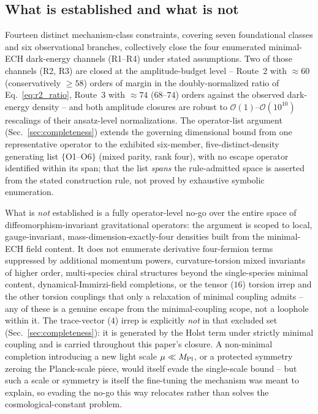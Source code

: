 \documentclass[aps,prd,twocolumn,superscriptaddress,preprintnumbers,nofootinbib,longbibliography,floatfix]{revtex4-2}
\newcommand{\MPl}{M_{\rm Pl}}
\begin{document}
\subsection{What is established and what is not}
Fourteen distinct mechanism-class constraints, covering seven
foundational classes and six observational branches, collectively close
the four enumerated minimal-ECH dark-energy channels (R1--R4) under
stated assumptions. Two of those channels (R2, R3) are closed at the
amplitude-budget level -- Route~2 with ${\approx}60$ (conservatively
$\geq58$) orders of margin in the doubly-normalized ratio of
Eq.~\eqref{eq:r2_ratio}, Route~3 with $\approx74$ ($68$--$74$) orders
against the observed dark-energy density -- and both amplitude closures
are robust to
$\mathcal O(1)$--$\mathcal O(10^{10})$ rescalings of their ansatz-level
normalizations. The operator-list argument (Sec.~\ref{sec:completeness})
extends the governing dimensional bound from one representative operator
to the exhibited six-member, five-distinct-density generating list
$\{$O1--O6$\}$ (mixed parity, rank four), with no escape operator
identified within its span; that the list \emph{spans} the
rule-admitted space is asserted from the stated construction rule, not
proved by exhaustive symbolic enumeration.

What is \emph{not} established is a fully operator-level no-go over the
entire space of diffeomorphism-invariant gravitational operators: the
argument is scoped to local, gauge-invariant, mass-dimension-exactly-four
densities built from the minimal-ECH field content. It does not
enumerate derivative four-fermion terms suppressed by additional
momentum powers, curvature-torsion mixed invariants of higher order,
multi-species chiral structures beyond the single-species minimal
content, dynamical-Immirzi-field completions, or the tensor ($16$)
torsion irrep and the other torsion couplings that only a relaxation of
minimal coupling admits -- any of these is a genuine escape from the
minimal-coupling scope, not a loophole within it. The trace-vector ($4$)
irrep is explicitly \emph{not} in that excluded set (Sec.~\ref{sec:completeness}):
it is generated by the Holst term under strictly minimal coupling and is
carried throughout this paper's closure. A non-minimal completion
introducing a new light scale $\mu\ll\MPl$, or a protected symmetry
zeroing the Planck-scale piece, would itself evade the single-scale
bound -- but such a scale or symmetry is itself the fine-tuning the
mechanism was meant to explain, so evading the no-go this way relocates
rather than solves the cosmological-constant problem.
\end{document}
